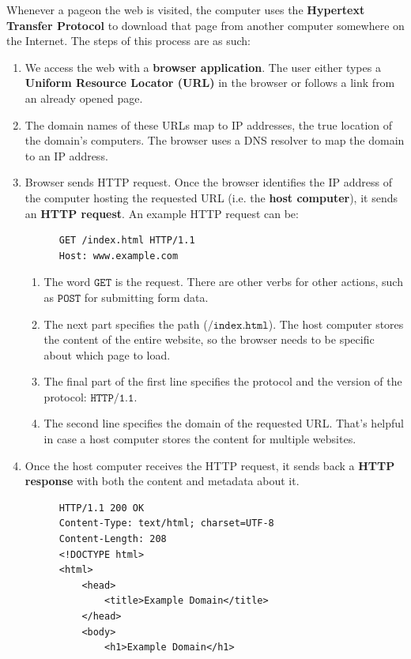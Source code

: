 \documentclass{article}
\newcounter{example}[section]
\begin{document}
  Whenever a pageon the web is visited, the computer uses the \textbf{Hypertext Transfer Protocol} to download that page from another computer somewhere on the Internet. The steps of this process are as such: 
  \begin{enumerate}
      \item We access the web with a \textbf{browser application}. The user either types a \textbf{Uniform Resource Locator (URL)} in the browser or follows a link from an already opened page. 
      \item The domain names of these URLs map to IP addresses, the true location of the domain's computers. The browser uses a DNS resolver to map the domain to an IP address. 
      \item Browser sends HTTP request. Once the browser identifies the IP address of the computer hosting the requested URL (i.e. the \textbf{host computer}), it sends an \textbf{HTTP request}. An example HTTP request can be: 
      \begin{lstlisting}
      GET /index.html HTTP/1.1
      Host: www.example.com
      \end{lstlisting}
      \begin{enumerate}
          \item The word $\texttt{GET}$ is the request. There are other verbs for other actions, such as $\texttt{POST}$ for submitting form data. 
          \item The next part specifies the path ($\texttt{/index.html}$). The host computer stores the content of the entire website, so the browser needs to be specific about which page to load.
          \item The final part of the first line specifies the protocol and the version of the protocol: $\texttt{HTTP/1.1}$. 
          \item The second line specifies the domain of the requested URL. That's helpful in case a host computer stores the content for multiple websites.
      \end{enumerate}
      \item Once the host computer receives the HTTP request, it sends back a \textbf{HTTP response} with both the content and metadata about it. 
      \begin{lstlisting}
      HTTP/1.1 200 OK
      Content-Type: text/html; charset=UTF-8
      Content-Length: 208
      <!DOCTYPE html>
      <html>
          <head>
              <title>Example Domain</title>
          </head>
          <body>
              <h1>Example Domain</h1>

\end{lstlisting}
\end{enumerate}
\end{document}
